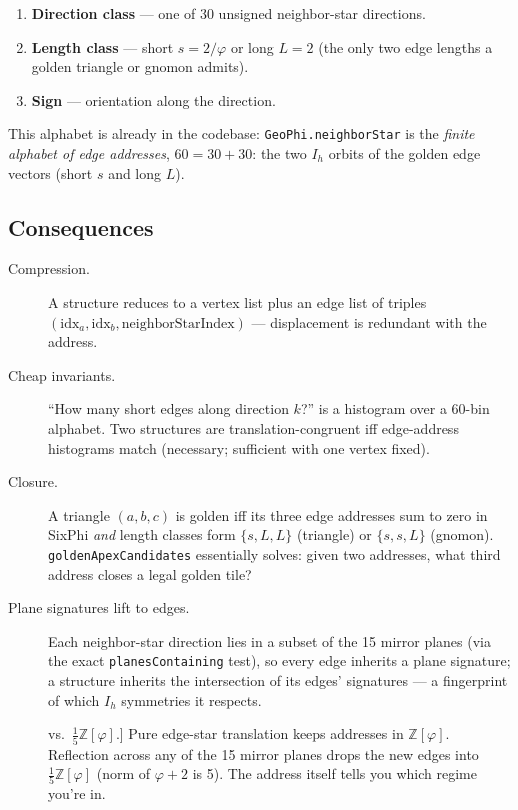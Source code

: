 \documentclass[11pt]{article}
\newcommand{\phigold}{\varphi}
\newcommand{\Zphi}{\mathbb{Z}[\phigold]}
\begin{document}
\begin{enumerate}
  \item \textbf{Direction class} --- one of 30 unsigned neighbor-star
        directions.
  \item \textbf{Length class} --- short \(s = 2/\phigold\) or long
        \(L = 2\) (the only two edge lengths a golden triangle or gnomon
        admits).
  \item \textbf{Sign} --- orientation along the direction.
\end{enumerate}

This alphabet is already in the codebase: \texttt{GeoPhi.neighborStar} is
the \emph{finite alphabet of edge addresses}, \(60 = 30 + 30\): the two
\(I_h\) orbits of the golden edge vectors (short \(s\) and long \(L\)).

\subsection{Consequences}

\begin{description}
  \item[Compression.] A structure reduces to a vertex list plus an edge
        list of triples \((\text{idx}_a, \text{idx}_b,
        \text{neighborStarIndex})\) --- displacement is redundant with the
        address.
  \item[Cheap invariants.] ``How many short edges along direction \(k\)?''
        is a histogram over a 60-bin alphabet. Two structures are
        translation-congruent iff edge-address histograms match (necessary;
        sufficient with one vertex fixed).
  \item[Closure.] A triangle \((a,b,c)\) is golden iff its three edge
        addresses sum to zero in SixPhi \emph{and} length classes form
        \(\{s,L,L\}\) (triangle) or \(\{s,s,L\}\) (gnomon).
        \texttt{goldenApexCandidates} essentially solves: given two
        addresses, what third address closes a legal golden tile?
  \item[Plane signatures lift to edges.] Each neighbor-star direction lies
        in a subset of the 15 mirror planes (via the exact
        \texttt{planesContaining} test), so every edge inherits a plane
        signature; a structure inherits the intersection of its edges'
        signatures --- a fingerprint of which \(I_h\) symmetries it
        respects.
  \item[\(\Zphi\) vs.\ \(\tfrac{1}{5}\Zphi\).] Pure edge-star translation
        keeps addresses in \(\Zphi\). Reflection across any of the 15
        mirror planes drops the new edges into \(\tfrac{1}{5}\Zphi\) (norm
        of \(\phigold+2\) is 5). The address itself tells you which regime
        you're in.
\end{description}
\end{document}
